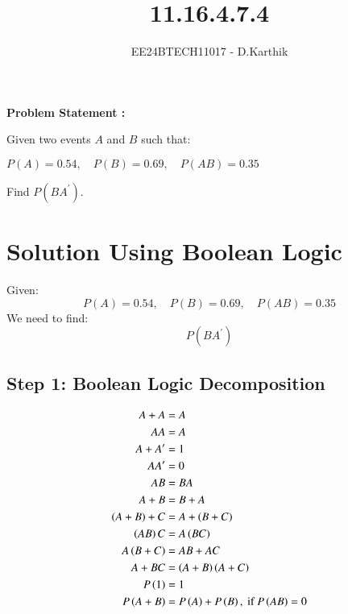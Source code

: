 \documentclass[journal]{IEEEtran}
\begin{document}

\vspace{3cm}

\title{11.16.4.7.4}
\author{EE24BTECH11017 - D.Karthik}
 \maketitle
{\let\newpage\relax\maketitle}

\renewcommand{\thefigure}{\theenumi}
\renewcommand{\thetable}{\theenumi}
\setlength{\intextsep}{10pt} %


\renewcommand{\thetable}{\theenumi}
\textbf{Problem Statement :}

Given two events \( A \) and \( B \) such that:


   $ P(A) = 0.54, \quad P(B) = 0.69, \quad P(A  B) = 0.35$

Find \( P(B  A^\prime) \).
\section*{Solution Using Boolean Logic}

Given:
\[
P(A) = 0.54, \quad P(B) = 0.69, \quad P(A  B) = 0.35
\]
We need to find:
\[
P(B A^\prime)
\]

\subsection*{Step 1: Boolean Logic Decomposition}

\begin{align}
    A + A &= A\\
    AA &= A \\
    A + A^\prime  &= 1\\
    AA^\prime  &= 0 \\
    AB &= BA\\
    A + B &= B + A\\
    \left(A + B\right) + C &= A + \left(B + C\right) \\
    \left(AB\right)C &= A\left(BC\right) \\
    A\left(B + C\right) &= AB + AC \\
    A + BC &= \left(A + B\right)\left(A + C\right) \\
    P\left(1\right) &= 1\\
    P\left(A + B\right) &= P\left(A\right) + P\left(B\right), \text{ if } P\left(AB\right) = 0
\end{align}
\end{document}

